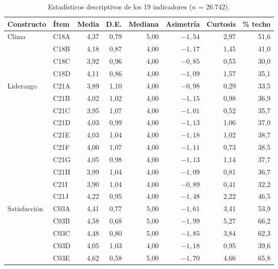 \documentclass[11pt,a4paper]{article}
\begin{document}
\begin{table}[htbp]
\centering
\caption{Estadísticos descriptivos de los 19 indicadores ($n$ = 26.742).}
\label{tab:descriptivos}
\small
\begin{tabular}{@{}llrrrrrr@{}}
\toprule
Constructo & Ítem & Media & D.E. & Mediana & Asimetría & Curtosis & \% techo \\
\midrule
Clima & C18A & 4,37 & 0,79 & 5,00 & $-1,54$ & 2,97 & 51,6 \\
      & C18B & 4,18 & 0,87 & 4,00 & $-1,17$ & 1,45 & 41,0 \\
      & C18C & 3,92 & 0,96 & 4,00 & $-0,85$ & 0,55 & 30,0 \\
      & C18D & 4,11 & 0,86 & 4,00 & $-1,09$ & 1,57 & 35,1 \\
Liderazgo & C21A & 3,89 & 1,10 & 4,00 & $-0,98$ & 0,29 & 33,5 \\
      & C21B & 4,02 & 1,02 & 4,00 & $-1,15$ & 0,98 & 36,9 \\
      & C21C & 3,95 & 1,07 & 4,00 & $-1,01$ & 0,52 & 35,7 \\
      & C21D & 4,03 & 0,99 & 4,00 & $-1,13$ & 1,06 & 37,0 \\
      & C21E & 4,03 & 1,04 & 4,00 & $-1,18$ & 1,02 & 38,7 \\
      & C21F & 4,00 & 1,07 & 4,00 & $-1,11$ & 0,73 & 38,5 \\
      & C21G & 4,05 & 0,98 & 4,00 & $-1,13$ & 1,14 & 37,7 \\
      & C21H & 3,99 & 1,04 & 4,00 & $-1,09$ & 0,81 & 36,7 \\
      & C21I & 3,90 & 1,04 & 4,00 & $-0,89$ & 0,41 & 32,2 \\
      & C21J & 4,22 & 0,95 & 4,00 & $-1,48$ & 2,22 & 46,5 \\
Satisfacción & C03A & 4,41 & 0,77 & 5,00 & $-1,61$ & 3,41 & 53,9 \\
      & C03B & 4,58 & 0,68 & 5,00 & $-1,99$ & 5,27 & 66,2 \\
      & C03C & 4,48 & 0,80 & 5,00 & $-1,85$ & 3,84 & 62,3 \\
      & C03D & 4,05 & 1,03 & 4,00 & $-1,18$ & 0,95 & 39,6 \\
      & C03E & 4,62 & 0,58 & 5,00 & $-1,70$ & 4,66 & 65,8 \\
\bottomrule
\end{tabular}
\end{table}
\end{document}
